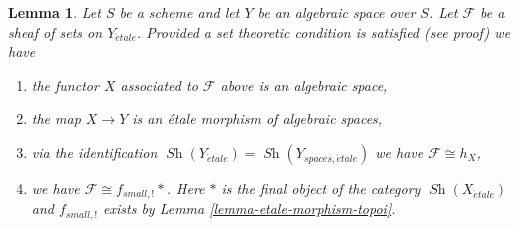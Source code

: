 \documentclass{stacks-project}
\theoremstyle{plain}
\newtheorem{lemma}[subsection]{Lemma}
\theoremstyle{definition}
\theoremstyle{remark}
\numberwithin{equation}{subsection}
\def\Sh{\mathop{\mathit{Sh}}\nolimits}
\def\etale{{\acute{e}tale}}
\begin{document}
\begin{lemma}
\label{lemma-sheaf-gives-space}
Let $S$ be a scheme and let $Y$ be an algebraic space over $S$.
Let $\mathcal{F}$ be a sheaf of sets on $Y_\etale$.
Provided a set theoretic condition is satisfied (see proof) we have
\begin{enumerate}
\item the functor $X$ associated to $\mathcal{F}$ above is an
algebraic space,
\item the map $X \to Y$ is an \'etale morphism of algebraic spaces,
\item via the identification $\Sh(Y_\etale) = \Sh(Y_{spaces, \etale})$
we have $\mathcal{F} \cong h_X$,
\item we have $\mathcal{F} \cong f_{small, !}*$. Here $*$ is the final object
of the category $\Sh(X_\etale)$ and $f_{small, !}$ exists by
Lemma \ref{lemma-etale-morphism-topoi}.
\end{enumerate}
\end{lemma}
\end{document}
